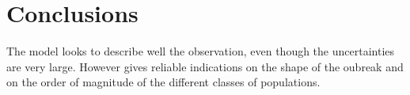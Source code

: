 \section{Conclusions}
The model looks to describe well the observation, even though the uncertainties are very large. However gives reliable indications on the shape of the oubreak and on the order of magnitude of the different classes of populations.